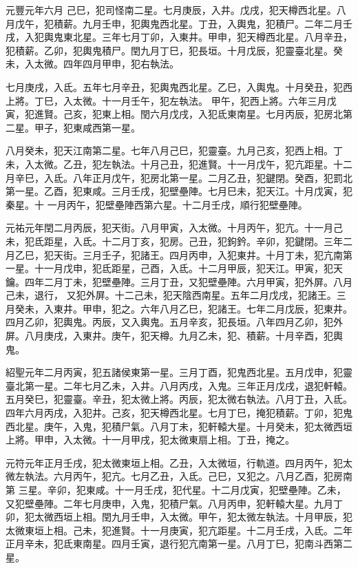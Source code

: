 \begin{pinyinscope}
 元豐元年六月
 己巳，犯司怪南二星。七月庚辰，入井。戊戌，犯天樽西北星。八月戊午，犯積薪。九月壬申，犯輿鬼西北星。丁丑，入輿鬼，犯積尸。二年二月壬戌，入犯輿鬼東北星。三年七月丁卯，入東井。甲申，犯天樽西北星。八月辛丑，犯積薪。乙卯，犯輿鬼積尸。閏九月丁巳，犯長垣。十月戊辰，犯靈臺北星。癸未，入太微。四年四月甲申，犯右執法。



 七月庚戌，入氐。五年七月辛丑，犯輿鬼西北星。乙巳，入輿鬼。十月癸丑，犯西上將。丁巳，入太微。十一月壬午，犯左執法。
 甲午，犯西上將。六年三月戊寅，犯進賢。己亥，犯東上相。閏六月戊戌，入犯氐東南星。七月丙辰，犯房北第二星。甲子，犯東咸西第一星。



 八月癸未，犯天江南第二星。七年八月己巳，犯靈臺。九月己亥，犯西上相。丁未，入太微。乙丑，犯左執法。十月己丑，犯進賢。十一月戊午，犯亢距星。十二月辛巳，入氐。八年正月戊午，犯房北第一星。二月乙丑，犯鍵閉。癸酉，犯罰北第一星。乙酉，犯東咸。三月壬戌，犯壁壘陣。七月巳未，犯天江。十月戊寅，犯秦星。十
 一月丙午，犯壁壘陣西第六星。十二月壬戌，順行犯壁壘陣。



 元祐元年閏二月丙辰，犯天街。八月甲寅，入太微。十月丙午，犯亢。十一月己未，犯氐距星，入氐。十二月丁亥，犯房。己丑，犯鉤鈐。辛卯，犯鍵閉。三年二月乙巳，犯天街。三月壬子，犯諸王。四月丙申，入犯東井。十月丁未，犯亢南第一星。十一月戊申，犯氐距星，己酉，入氐。十二月甲辰，犯天江。甲寅，犯天鑰。四年二月丁未，犯壁壘陣。三月丁丑，又犯壁壘陣。六月甲寅，犯外屏。八月己未，退行，
 又犯外屏。十二己未，犯天陰西南星。五年二月戊戌，犯諸王。三月癸未，入東井。甲申，犯之。六年八月乙巳，犯諸王。七年二月戊辰，犯東井。四月乙卯，犯輿鬼。丙辰，又入輿鬼。五月辛亥，犯長垣。八年四月乙卯，犯外屏。八月庚戌，入東井。庚午，犯天樽。九月乙未，犯、積薪。十月辛酉，犯輿鬼。



 紹聖元年二月丙寅，犯五諸侯東第一星。三月丁酉，犯鬼西北星。五月戊申，犯靈臺北第一星。二年七月乙未，入井。八月丙戌，入鬼。三年正月戊戌，退犯軒轅。
 五月癸巳，犯靈臺。辛丑，犯太微上將。丙辰，犯太微右執法。八月丁丑，入氐。四年六月丙戌，入犯井。己亥，犯天樽西北星。七月丁巳，掩犯積薪。丁卯，犯鬼西北星。庚午，入鬼，犯積尸氣。八月丁未，犯軒轅大星。十月癸未，犯太微西垣上將。甲申，入太微。十一月甲戌，犯太微東扇上相。丁丑，掩之。



 元符元年正月壬戌，犯太微東垣上相。乙丑，入太微垣，行軌道。四月丙午，犯太微左執法。六月丙午，犯亢。七月乙丑，入氐。己巳，又犯之。八月乙酉，犯房南第
 三星。辛卯，犯東咸。十一月壬戌，犯代星。十二月戊寅，犯壁壘陣。乙未，又犯壁壘陣。二年七月庚申，入鬼，犯積尸氣。八月丙申，犯軒轅大星。九月丁卯，犯太微西垣上相。閏九月壬申，入太微。甲午，犯太微左執法。十月甲辰，犯太微東垣上相。己未，犯進賢。十一月庚寅，犯亢距星。十二月壬戌，入氐。二年正月辛未，犯氐東南星。四月壬寅，退行犯亢南第一星。八月丁巳，犯南斗西第二星。




\end{pinyinscope}
